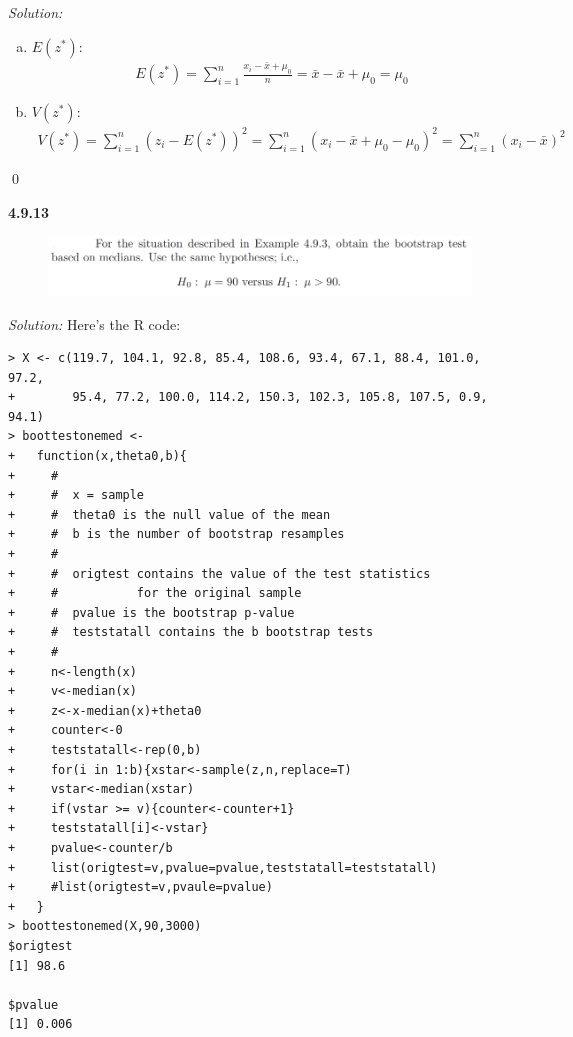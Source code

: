 \documentclass{book}
\theoremstyle{definition}
\newcommand{\f}[2]{\frac{#1}{#2}}
\begin{document}
\noindent \textit{Solution:} 

\begin{enumerate}[(a)]
	\item $E(z^*)$:
	\begin{align}
	E(z^*) = \sum^n_{i=1}\f{x_i - \bar{x} + \mu_0}{n} = \bar{x} - \bar{x}+\mu_0 = \boxed{\mu_0}
	\end{align}
	
	\item $V(z^*)$:
	\begin{align}
	V(z^*) = \sum^n_{i=1}(z_i - E(z^*))^2 = \sum^n_{i=1}(x_i - \bar{x}+\mu_0 - \mu_0)^2 = \boxed{\sum^n_{i=1}(x_i - \bar{x})^2}
	\end{align}
\end{enumerate}\qed




















\newpage
\noindent\textbf{4.9.13}

\begin{figure}[!htb]
	\centering
	\includegraphics[scale=0.5]{4913}
\end{figure}



\noindent \textit{Solution:} Here's the R code:
\begin{lstlisting}
> X <- c(119.7, 104.1, 92.8, 85.4, 108.6, 93.4, 67.1, 88.4, 101.0, 97.2,
+        95.4, 77.2, 100.0, 114.2, 150.3, 102.3, 105.8, 107.5, 0.9, 94.1)
> boottestonemed <-
+   function(x,theta0,b){
+     #
+     #  x = sample
+     #  theta0 is the null value of the mean
+     #  b is the number of bootstrap resamples
+     #
+     #  origtest contains the value of the test statistics 
+     #           for the original sample
+     #  pvalue is the bootstrap p-value
+     #  teststatall contains the b bootstrap tests
+     #
+     n<-length(x)
+     v<-median(x)
+     z<-x-median(x)+theta0
+     counter<-0
+     teststatall<-rep(0,b)
+     for(i in 1:b){xstar<-sample(z,n,replace=T)
+     vstar<-median(xstar)
+     if(vstar >= v){counter<-counter+1}
+     teststatall[i]<-vstar}
+     pvalue<-counter/b
+     list(origtest=v,pvalue=pvalue,teststatall=teststatall)
+     #list(origtest=v,pvaule=pvalue)
+   }
> boottestonemed(X,90,3000)
$origtest
[1] 98.6

$pvalue
[1] 0.006
\end{lstlisting}
\end{document}
